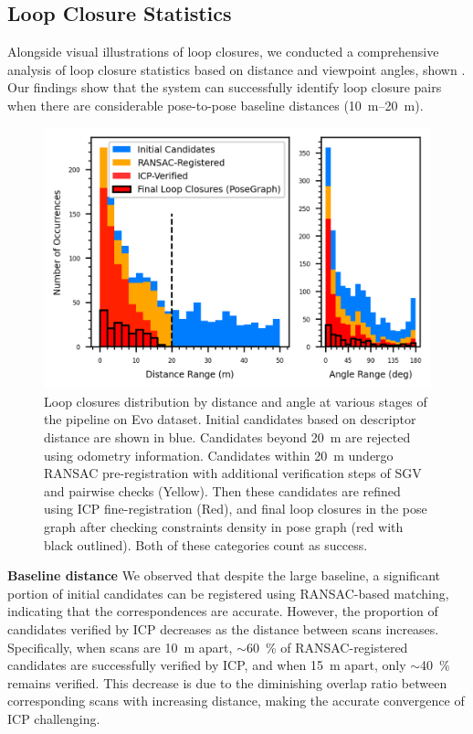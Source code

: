 \subsection*{Loop Closure Statistics}
Alongside visual illustrations of loop closures, we conducted a comprehensive analysis of loop closure statistics based on distance and viewpoint angles, shown . Our findings show that the system can successfully identify loop closure pairs when there are considerable pose-to-pose baseline distances (\SIrange{10}{20}{\meter}). \vspace{5pt}
\begin{figure}[t]
  \centering
  \includegraphics[width=0.85\columnwidth]{pics/exp_2_2_loop_closure_histograms}
  \caption{Loop closures distribution by distance and angle at various stages of the pipeline on Evo dataset.
   Initial candidates based on descriptor distance are shown in blue. Candidates beyond \SI{20}{\meter} are rejected using odometry information. Candidates within \SI{20}{\meter} undergo RANSAC pre-registration with additional verification steps of SGV\cite{vidanapathirana2023ral} and pairwise checks (Yellow). Then these candidates are refined using ICP fine-registration (Red), and final loop closures in the pose graph after checking constraints density in pose graph (red with black outlined). Both of these categories count as success.}
  \label{fig:exp_2_2_loop_closure_histograms}
\end{figure}

\noindent \textbf{Baseline distance}\hspace{0.5em} We observed that despite the large baseline, a significant portion of initial candidates can be registered using RANSAC-based matching, indicating that the correspondences are accurate. However, the proportion of candidates verified by ICP decreases as the distance between scans increases. Specifically, when scans are \SI{10}{\meter} apart, $\sim$\SI{60}{\percent} of RANSAC-registered candidates are successfully verified by ICP, and when \SI{15}{\meter} apart, only $\sim$\SI{40}{\percent} remains verified. This decrease is due to the diminishing overlap ratio between corresponding scans with increasing distance, making the accurate convergence of ICP challenging. \vspace{5pt}

